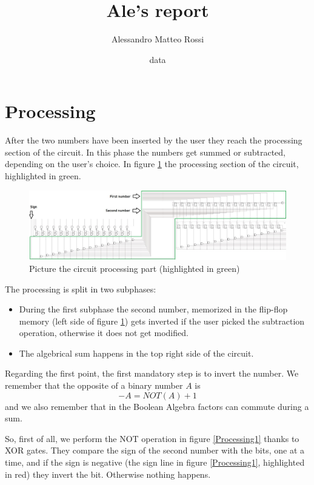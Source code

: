 \documentclass{article}
\title{Ale's report}
\author{Alessandro Matteo Rossi}
\date{data}
\begin{document}
\maketitle




\tableofcontents

\clearpage
\section{Processing}

After the two numbers have been inserted by the user they reach the processing section of the circuit. In this phase the numbers get summed or subtracted, depending on the user's choice. In figure \ref{Processing_Total} the processing section of the circuit, highlighted in green.

\begin{figure}[h]
  \centering
  \includegraphics[scale=0.43]{SC_Processing_Total.JPG}
  \caption{Picture the circuit processing part (highlighted in green)}
  \label{Processing_Total}
\end{figure}

The processing is split in two subphases:
\begin{itemize}
  \item During the first subphase the second number, memorized in the flip-flop memory (left side of figure \ref{Processing_Total}) gets inverted if the user picked the subtraction operation, otherwise it does not get modified.
  \item The algebrical sum happens in the top right side of the circuit.
\end{itemize}

Regarding the first point, the first mandatory step is to invert the number. We remember that the opposite of a binary number $A$ is
\begin{equation}
-A=NOT(A)+1
\label{Law}
\end{equation}
and we also remember that in the Boolean Algebra factors can commute during a sum.

So, first of all, we perform the NOT operation in figure \ref{Processing1} thanks to XOR gates. They compare the sign of the second number with the bits, one at a time, and if the sign is negative (the sign line in figure \ref{Processing1}, highlighted in red) they invert the bit. Otherwise nothing happens.
\end{document}
